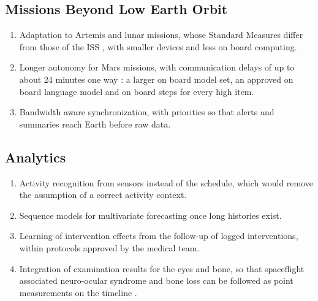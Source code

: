 \subsection{Missions Beyond Low Earth Orbit}
\label{subsec:future-platform}

\begin{enumerate}
\item Adaptation to Artemis and lunar missions, whose Standard Measures differ from those of the ISS \cite{nasa_artemis_ii_standard_measures}, with smaller devices and less on board computing.
\item Longer autonomy for Mars missions, with communication delays of up to about 24 minutes one way \cite{nasa_space_communications_seven_things}: a larger on board model set, an approved on board language model and on board steps for every high item.
\item Bandwidth aware synchronization, with priorities so that alerts and summaries reach Earth before raw data.
\end{enumerate}

\subsection{Analytics}
\label{subsec:future-analytics}

\begin{enumerate}
\item Activity recognition from sensors instead of the schedule, which would remove the assumption of a correct activity context.
\item Sequence models for multivariate forecasting once long histories exist.
\item Learning of intervention effects from the follow-up of logged interventions, within protocols approved by the medical team.
\item Integration of examination results for the eyes and bone, so that spaceflight associated neuro-ocular syndrome and bone loss can be followed as point measurements on the timeline \cite{nasa_hrr_sans,lang2004bone}.
\end{enumerate}
